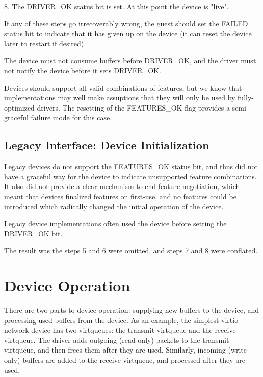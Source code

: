 8. The DRIVER_OK status bit is set.  At this point the device is
   "live".

If any of these steps go irrecoverably wrong, the guest should
set the FAILED status bit to indicate that it has given up on the
device (it can reset the device later to restart if desired).

The device must not consume buffers before DRIVER_OK, and the driver
must not notify the device before it sets DRIVER_OK.

Devices should support all valid combinations of features, but we know
that implementations may well make assuptions that they will only be
used by fully-optimized drivers.  The resetting of the FEATURES_OK flag
provides a semi-graceful failure mode for this case.

\subsection{Legacy Interface: Device Initialization}\label{sec:General Initialization And Device Operation / Device Initialization / Legacy Interface: Device Initialization}
Legacy devices do not support the FEATURES_OK status bit, and thus did
not have a graceful way for the device to indicate unsupported feature
combinations.  It also did not provide a clear mechanism to end
feature negotiation, which meant that devices finalized features on
first-use, and no features could be introduced which radically changed
the initial operation of the device.

Legacy device implementations often used the device before setting the
DRIVER_OK bit.

The result was the steps 5 and 6 were omitted, and steps 7 and 8
were conflated.

\section{Device Operation}\label{sec:General Initialization And Device Operation / Device Operation}

There are two parts to device operation: supplying new buffers to
the device, and processing used buffers from the device. As an
example, the simplest virtio network device has two virtqueues: the
transmit virtqueue and the receive virtqueue. The driver adds
outgoing (read-only) packets to the transmit virtqueue, and then
frees them after they are used. Similarly, incoming (write-only)
buffers are added to the receive virtqueue, and processed after
they are used.

